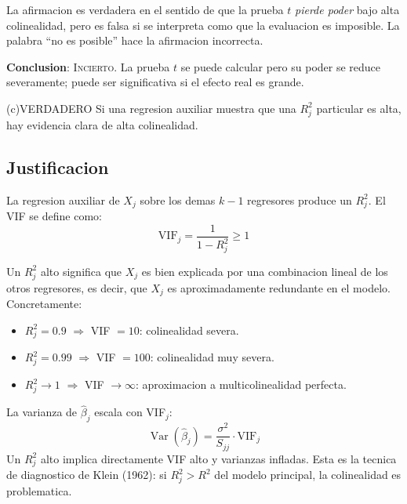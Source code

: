 \documentclass[12pt, letterpaper]{article}
\theoremstyle{remark}
\newcommand{\Var}{\operatorname{Var}}
\begin{document}
La afirmacion es verdadera en el sentido de que la prueba $t$ \emph{pierde poder}
bajo alta colinealidad, pero es falsa si se interpreta como que la evaluacion
es imposible. La palabra ``no es posible'' hace la afirmacion incorrecta.

\textbf{Conclusion}: \textsc{Incierto}. La prueba $t$ se puede calcular pero
su poder se reduce severamente; puede ser significativa si el efecto real es
grande.

\bigskip

\begin{verdict}{(c)}{VERDADERO}
  Si una regresion auxiliar muestra que una $R^2_j$ particular es alta, hay
  evidencia clara de alta colinealidad.
\end{verdict}

\subsection*{Justificacion}

La regresion auxiliar de $X_j$ sobre los demas $k-1$ regresores produce un
$R^2_j$. El VIF se define como:
\begin{equation}
  \text{VIF}_j = \frac{1}{1 - R^2_j} \geq 1
  \label{eq:VIF_R2}
\end{equation}

Un $R^2_j$ alto significa que $X_j$ es bien explicada por una combinacion
lineal de los otros regresores, es decir, que $X_j$ es aproximadamente
redundante en el modelo. Concretamente:

\begin{itemize}[leftmargin=1.6em, itemsep=3pt]
  \item $R^2_j = 0.9$ $\Rightarrow$ VIF $= 10$: colinealidad severa.
  \item $R^2_j = 0.99$ $\Rightarrow$ VIF $= 100$: colinealidad muy severa.
  \item $R^2_j \to 1$ $\Rightarrow$ VIF $\to \infty$: aproximacion a multicolinealidad perfecta.
\end{itemize}

La varianza de $\hat\beta_j$ escala con VIF$_j$:
\begin{equation}
  \Var(\hat\beta_j) = \frac{\sigma^2}{S_{jj}} \cdot \text{VIF}_j
  \label{eq:var_VIF}
\end{equation}
Un $R^2_j$ alto implica directamente VIF alto y varianzas infladas. Esta es
la tecnica de diagnostico de Klein (1962): si $R^2_j > R^2$ del modelo principal,
la colinealidad es problematica.
\end{document}
